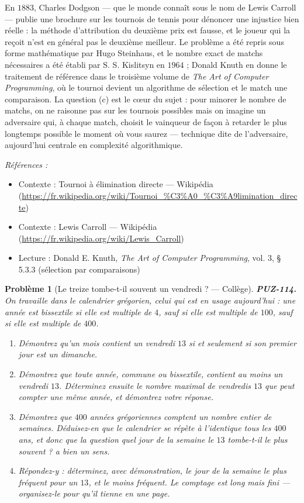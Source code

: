 \documentclass[11pt]{article}
\newtheorem{problem}{Problème}
\newenvironment{refs}{\par\small\noindent\emph{Références :}\begin{itemize}\setlength\itemsep{0pt}}{\end{itemize}\normalsize}
\begin{document}
\noindent En $ 1883 $, Charles Dodgson --- que le monde connaît sous le nom de Lewis
Carroll --- publie une brochure sur les tournois de tennis pour dénoncer une injustice bien
réelle : la méthode d'attribution du deuxième prix est fausse, et le joueur qui la reçoit n'est
en général pas le deuxième meilleur. Le problème a été repris sous forme mathématique par Hugo
Steinhaus, et le nombre exact de matchs nécessaires a été établi par S. S. Kislitsyn en
$ 1964 $ ; Donald Knuth en donne le traitement de référence dans le troisième volume de
\textit{The Art of Computer Programming}, où le tournoi devient un algorithme de sélection et le
match une comparaison. La question (c) est le c\oe{}ur du sujet : pour minorer le nombre de matchs,
on ne raisonne pas sur les tournois possibles mais on imagine un adversaire qui, à chaque
match, choisit le vainqueur de façon à retarder le plus longtemps possible le moment où vous
saurez --- technique dite de l'adversaire, aujourd'hui centrale en complexité algorithmique.

\begin{refs}
\item Contexte : Tournoi à élimination directe --- Wikipédia (\url{https://fr.wikipedia.org/wiki/Tournoi_%C3%A0_%C3%A9limination_directe})
\item Contexte : Lewis Carroll --- Wikipédia (\url{https://fr.wikipedia.org/wiki/Lewis_Carroll})
\item Lecture : Donald E. Knuth, \textit{The Art of Computer Programming}, vol. 3, \S{} 5.3.3 (sélection par comparaisons)
\end{refs}

\bigskip

\begin{problem}[{Le treize tombe-t-il souvent un vendredi ? --- Collège}]
\textbf{PUZ-114.} On travaille dans le calendrier grégorien, celui qui est en usage
aujourd'hui : une année est bissextile si elle est multiple de $ 4 $, sauf si elle est
multiple de $ 100 $, sauf si elle est multiple de $ 400 $.
\begin{enumerate}
\item[(a)] Démontrez qu'un mois contient un vendredi $ 13 $ si et seulement si son premier jour est
un dimanche.
\item[(b)] Démontrez que toute année, commune ou bissextile, contient au moins un vendredi $ 13 $.
Déterminez ensuite le nombre maximal de vendredis $ 13 $ que peut compter une même année, et
démontrez votre réponse.
\item[(c)] Démontrez que $ 400 $ années grégoriennes comptent un nombre entier de semaines.
Déduisez-en que le calendrier se répète à l'identique tous les $ 400 $ ans, et donc que la
question \og{} quel jour de la semaine le $ 13 $ tombe-t-il le plus souvent ? \fg{} a bien un
sens.
\item[(d)] Répondez-y : déterminez, avec démonstration, le jour de la semaine le plus fréquent pour un
$ 13 $, et le moins fréquent. Le comptage est long mais fini --- organisez-le pour qu'il tienne
en une page.
\end{enumerate}

\end{problem}
\end{document}
